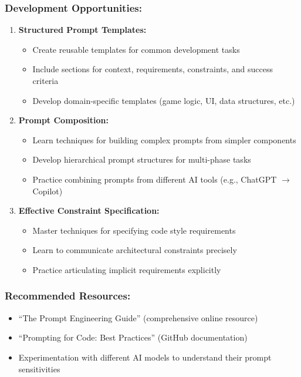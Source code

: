\documentclass[12pt,a4paper]{article}
\begin{document}
\subsubsection*{Development Opportunities:}

\begin{enumerate}
    \item \textbf{Structured Prompt Templates:}
    \begin{itemize}
        \item Create reusable templates for common development tasks
        \item Include sections for context, requirements, constraints, and success criteria
        \item Develop domain-specific templates (game logic, UI, data structures, etc.)
    \end{itemize}
    
    \item \textbf{Prompt Composition:}
    \begin{itemize}
        \item Learn techniques for building complex prompts from simpler components
        \item Develop hierarchical prompt structures for multi-phase tasks
        \item Practice combining prompts from different AI tools (e.g., ChatGPT $\rightarrow$ Copilot)
    \end{itemize}
    
    \item \textbf{Effective Constraint Specification:}
    \begin{itemize}
        \item Master techniques for specifying code style requirements
        \item Learn to communicate architectural constraints precisely
        \item Practice articulating implicit requirements explicitly
    \end{itemize}
\end{enumerate}

\subsubsection*{Recommended Resources:}
\begin{itemize}
    \item ``The Prompt Engineering Guide'' (comprehensive online resource)
    \item ``Prompting for Code: Best Practices'' (GitHub documentation)
    \item Experimentation with different AI models to understand their prompt sensitivities
\end{itemize}
\end{document}
